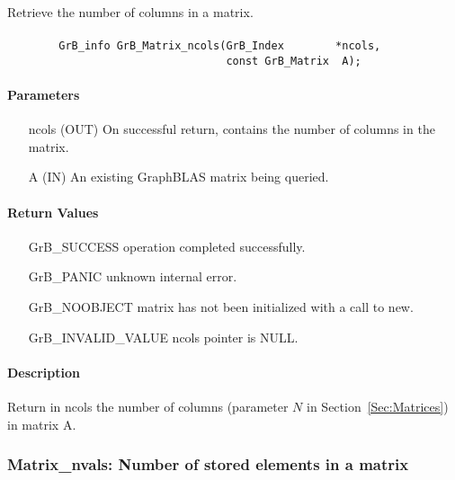 Retrieve the number of columns in a matrix.

\paragraph{\syntax}

\begin{verbatim}
        GrB_info GrB_Matrix_ncols(GrB_Index        *ncols,
                                  const GrB_Matrix  A);
\end{verbatim}

\paragraph{Parameters}

\begin{itemize}[leftmargin=1.1in]
    \item[{\sf ncols}] ({\sf OUT}) On successful return, contains the number of columns in the matrix.
    \item[{\sf A}] ({\sf IN}) An existing GraphBLAS matrix being queried.
\end{itemize}

\paragraph{Return Values}

\begin{itemize}[leftmargin=2.1in]
\item[{\sf GrB\_SUCCESS}]   operation completed successfully.
\item[{\sf GrB\_PANIC}]     unknown internal error.
\item[{\sf GrB\_NOOBJECT}]  matrix has not been initialized with a call to {\sf new}.
\item[{\sf GrB\_INVALID\_VALUE}]    {\sf ncols} pointer is {\sf NULL}.
\end{itemize}

\paragraph{Description}

Return in {\sf ncols} the number of columns (parameter $N$ in Section~\ref{Sec:Matrices}) in matrix {\sf A}.

\subsubsection{{\sf Matrix\_nvals}: Number of stored elements in a matrix}


